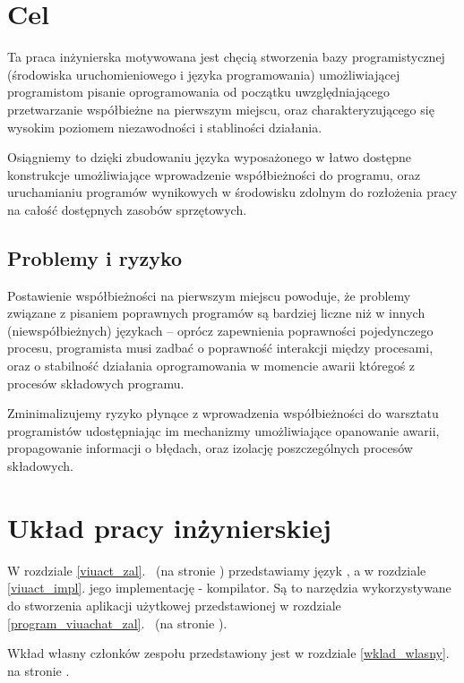 \section{Cel}

Ta praca inżynierska motywowana jest chęcią stworzenia bazy programistycznej
(środowiska uruchomieniowego i języka programowania) umożliwiającej programistom
pisanie oprogramowania od początku uwzględniającego przetwarzanie współbieżne na
pierwszym miejscu, oraz charakteryzującego się wysokim poziomem niezawodności i
stabliności działania.

Osiągniemy to dzięki zbudowaniu języka wyposażonego w łatwo dostępne konstrukcje
umożliwiające wprowadzenie współbieżności do programu, oraz uruchamianiu
programów wynikowych w środowisku zdolnym do rozłożenia pracy na całość
dostępnych zasobów sprzętowych.

\subsection{Problemy i ryzyko}

Postawienie współbieżności na pierwszym miejscu powoduje, że problemy związane z pisaniem poprawnych programów
są bardziej liczne niż w innych (niewspółbieżnych) językach -- oprócz zapewnienia poprawności pojedynczego
procesu, programista musi zadbać o poprawność interakcji między procesami, oraz o stabilność działania
oprogramowania w momencie awarii któregoś z procesów składowych programu.

Zminimalizujemy ryzyko płynące z wprowadzenia współbieżności do warsztatu programistów udostępniając im
mechanizmy umożliwiające opanowanie awarii, propagowanie informacji o błędach, oraz izolację poszczególnych
procesów składowych.

\section{Układ pracy inżynierskiej}

W rozdziale \ref{viuact_zal}.~ (na stronie \pageref{viuact_zal}) przedstawiamy język
\ViuAct, a w rozdziale \ref{viuact_impl}. jego implementację - kompilator. Są to narzędzia wykorzystywane do
stworzenia aplikacji użytkowej przedstawionej w rozdziale
\ref{program_viuachat_zal}.~ (na stronie \pageref{program_viuachat_zal}).

Wkład własny członków zespołu przedstawiony jest w rozdziale \ref{wklad_wlasny}. na stronie
\pageref{wklad_wlasny}.


